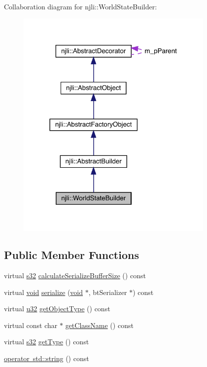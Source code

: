 Collaboration diagram for njli\+:\+:World\+State\+Builder\+:\nopagebreak
\begin{figure}[H]
\begin{center}
\leavevmode
\includegraphics[width=273pt]{classnjli_1_1_world_state_builder__coll__graph}
\end{center}
\end{figure}
\subsection*{Public Member Functions}
\begin{DoxyCompactItemize}
\item 
virtual \mbox{\hyperlink{_util_8h_aa62c75d314a0d1f37f79c4b73b2292e2}{s32}} \mbox{\hyperlink{classnjli_1_1_world_state_builder_a926bf582811a70861ca6e1f1ffc673f3}{calculate\+Serialize\+Buffer\+Size}} () const
\item 
virtual \mbox{\hyperlink{_thread_8h_af1e856da2e658414cb2456cb6f7ebc66}{void}} \mbox{\hyperlink{classnjli_1_1_world_state_builder_ad4dc15a533f9829df174aacd4f7283b2}{serialize}} (\mbox{\hyperlink{_thread_8h_af1e856da2e658414cb2456cb6f7ebc66}{void}} $\ast$, bt\+Serializer $\ast$) const
\item 
virtual \mbox{\hyperlink{_util_8h_a10e94b422ef0c20dcdec20d31a1f5049}{u32}} \mbox{\hyperlink{classnjli_1_1_world_state_builder_ad66b2b539e4c464ab42f933f7ee377eb}{get\+Object\+Type}} () const
\item 
virtual const char $\ast$ \mbox{\hyperlink{classnjli_1_1_world_state_builder_abc990ca34261391470dcde9253746cc6}{get\+Class\+Name}} () const
\item 
virtual \mbox{\hyperlink{_util_8h_aa62c75d314a0d1f37f79c4b73b2292e2}{s32}} \mbox{\hyperlink{classnjli_1_1_world_state_builder_ae6385f56dc9da2bc22ba5016b7010b15}{get\+Type}} () const
\item 
\mbox{\hyperlink{classnjli_1_1_world_state_builder_a465920e65ffdad6b25ba5b17c2f7cf5c}{operator std\+::string}} () const
\end{DoxyCompactItemize}
